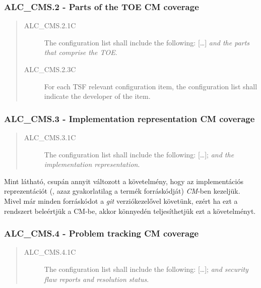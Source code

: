 \pagebreak[3]
\subsubsection{ALC\_CMS.2 - Parts of the TOE CM coverage}
\begin{quote}
    \begin{description}
        \item[ALC\_CMS.2.1C]{The configuration list shall include the following: [\ldots] \emph{and
            the parts that comprise the TOE}.}
        \item[ALC\_CMS.2.3C]{For each TSF relevant configuration item, the configuration list shall
            indicate the developer of the item.}
    \end{description}
\end{quote}


\pagebreak[3]
\subsubsection{ALC\_CMS.3 - Implementation representation CM coverage}
\begin{quote}
    \begin{description}
        \item[ALC\_CMS.3.1C]{The configuration list shall include the following: [\ldots];
            \emph{and the implementation representation}.}
    \end{description}
\end{quote}

Mint látható, csupán annyit változott a követelmény, hogy az implementációs reprezentációt (, azaz
gyakorlatilag a termék forráskódját) \emph{CM}-ben kezeljük. Mivel már minden forráskódot
a \emph{git} verziókezelővel követünk, ezért ha ezt a rendszert beleértjük a CM-be, akkor könnyedén
teljesíthetjük ezt a követelményt.

\pagebreak[3]
\subsubsection{ALC\_CMS.4 - Problem tracking CM coverage}
\begin{quote}
    \begin{description}
        \item[ALC\_CMS.4.1C]{The configuration list shall include the following: [\ldots]; \emph{and
            security flaw reports and resolution status}.}
    \end{description}
\end{quote}

